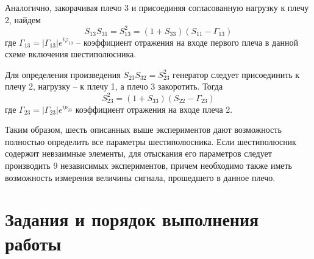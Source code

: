 ﻿\documentclass[a4paper,11pt]{article}
\begin{document}
Аналогично, закорачивая плечо 3 и присоединяя согласованную нагрузку к плечу 2, найдем 
\begin{equation}
	S _ { 13 } S _ { 31 } = S _ { 13 } ^ { 2 } = \left( 1 + S _ { 33 } \right) \left( S _ { 11 } - \Gamma _ { 13 } \right)
\end{equation}
где  $\Gamma _ { 13 } = \left| \Gamma _ { 13 } \right| e ^ { i \varphi _ { 13 } }$ -- коэффициент отражения на входе первого плеча в данной схеме включения шестиполюсника.

Для определения произведения $S_{23}S_{32}=S_{23}^2$ генератор следует
присоединить к плечу 2, нагрузку -- к плечу 1, а плечо 3 закоротить.
Тогда
\begin{equation}
	S _ { 23 } ^ { 2 } = \left( 1 + S _ { 33 } \right) \left( S _ { 22 } - \Gamma _ { 23 } \right)
\end{equation}
где $\Gamma _ { 23 } = \left| \Gamma _ { 23 } \right| e ^ { i p _ { 23 } }$ коэффициент отражения на входе плеча 2.

Таким образом, шесть описанных выше экспериментов дают возможность полностью определить все параметры  шестиполюсника.
Если шестиполюсник содержит невзаимные элементы, для отыскания его параметров следует производить 9 независимых экспериментов, причем необходимо также иметь возможность измерения величины сигнала, прошедшего в данное плечо.

\section{Задания и порядок выполнения работы}
\end{document}

